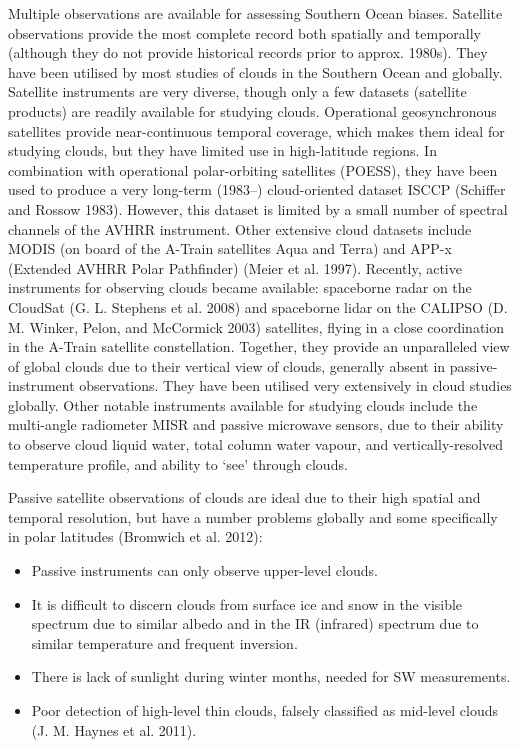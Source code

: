 Multiple observations are available for assessing Southern Ocean biases.
Satellite observations provide the most complete record both spatially
and temporally (although they do not provide historical records prior to
approx. 1980s). They have been utilised by most studies of clouds in the
Southern Ocean and globally. Satellite instruments are very diverse,
though only a few datasets (satellite products) are readily available
for studying clouds. Operational geosynchronous satellites provide
near-continuous temporal coverage, which makes them ideal for studying
clouds, but they have limited use in high-latitude regions. In
combination with operational polar-orbiting satellites (POESS), they
have been used to produce a very long-term (1983--) cloud-oriented
dataset ISCCP (Schiffer and Rossow 1983). However, this dataset is
limited by a small number of spectral channels of the AVHRR instrument.
Other extensive cloud datasets include MODIS (on board of the A-Train
satellites Aqua and Terra) and APP-x (Extended AVHRR Polar Pathfinder)
(Meier et al. 1997). Recently, active instruments for observing clouds
became available: spaceborne radar on the CloudSat (G. L. Stephens et
al. 2008) and spaceborne lidar on the CALIPSO (D. M. Winker, Pelon, and
McCormick 2003) satellites, flying in a close coordination in the
A-Train satellite constellation. Together, they provide an unparalleled
view of global clouds due to their vertical view of clouds, generally
absent in passive-instrument observations. They have been utilised very
extensively in cloud studies globally. Other notable instruments
available for studying clouds include the multi-angle radiometer MISR
and passive microwave sensors, due to their ability to observe cloud
liquid water, total column water vapour, and vertically-resolved
temperature profile, and ability to `see' through clouds.

Passive satellite observations of clouds are ideal due to their high
spatial and temporal resolution, but have a number problems globally and
some specifically in polar latitudes (Bromwich et al. 2012):

\begin{itemize}
\itemsep1pt\parskip0pt
\item
  Passive instruments can only observe upper-level clouds.
\item
  It is difficult to discern clouds from surface ice and snow in the
  visible spectrum due to similar albedo and in the IR (infrared)
  spectrum due to similar temperature and frequent inversion.
\item
  There is lack of sunlight during winter months, needed for SW
  measurements.
\item
  Poor detection of high-level thin clouds, falsely classified as
  mid-level clouds (J. M. Haynes et al. 2011).
\end{itemize}

